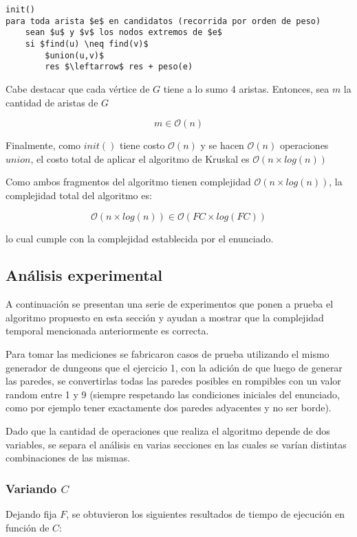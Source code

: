 \begin{lstlisting}
init()
para toda arista $e$ en candidatos (recorrida por orden de peso)
	sean $u$ y $v$ los nodos extremos de $e$
	si $find(u) \neq find(v)$
		$union(u,v)$
		res $\leftarrow$ res + peso(e)
\end{lstlisting}

Cabe destacar que cada vértice de $G$ tiene a lo sumo 4 aristas. Entonces, sea $m$ la cantidad de aristas de $G$

$$m \in \mathcal{O}(n)$$

Finalmente, como $init()$ tiene costo $\mathcal{O}(n)$ y se hacen $\mathcal{O}(n)$ operaciones $union$, el costo total de aplicar el algoritmo de Kruskal es $\mathcal{O}(n \times log(n))$

Como ambos fragmentos del algoritmo tienen complejidad $\mathcal{O}(n \times log(n))$, la complejidad total del algoritmo es:

$$\mathcal{O}(n \times log(n)) \in \mathcal{O}(FC \times log(FC))$$

lo cual cumple con la complejidad establecida por el enunciado. \QEDB

\subsection{Análisis experimental}

A continuación se presentan una serie de experimentos que ponen a prueba el algoritmo propuesto en esta sección y ayudan a mostrar que la complejidad temporal mencionada anteriormente es correcta.

Para tomar las mediciones se fabricaron casos de prueba utilizando el mismo generador de dungeons que el ejercicio 1, con la adición de que luego de generar las paredes, se convertirlas todas las paredes posibles en rompibles con un valor random entre 1 y 9 (siempre respetando las condiciones iniciales del enunciado, como por ejemplo tener exactamente dos paredes adyacentes y no ser borde).

Dado que la cantidad de operaciones que realiza el algoritmo depende de dos variables, se separa el análisis en varias secciones en las cuales se varían distintas combinaciones de las mismas.

\subsubsection{Variando $C$}

Dejando fija $F$, se obtuvieron los siguientes resultados de tiempo de ejecución en función de $C$:

